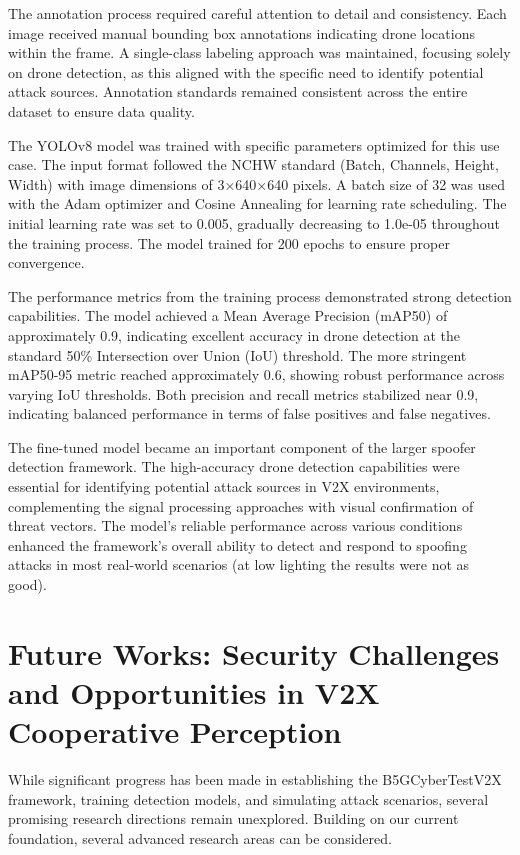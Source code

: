 The annotation process required careful attention to detail and consistency. Each image received manual bounding box annotations indicating drone locations within the frame. A single-class labeling approach was maintained, focusing solely on drone detection, as this aligned with the specific need to identify potential attack sources. Annotation standards remained consistent across the entire dataset to ensure data quality.

The YOLOv8 model was trained with specific parameters optimized for this use case. The input format followed the NCHW standard (Batch, Channels, Height, Width) with image dimensions of 3×640×640 pixels. A batch size of 32 was used with the Adam optimizer and Cosine Annealing for learning rate scheduling. The initial learning rate was set to 0.005, gradually decreasing to 1.0e-05 throughout the training process. The model trained for 200 epochs to ensure proper convergence.

The performance metrics from the training process demonstrated strong detection capabilities. The model achieved a Mean Average Precision (mAP50) of approximately 0.9, indicating excellent accuracy in drone detection at the standard 50\% Intersection over Union (IoU) threshold. The more stringent mAP50-95 metric reached approximately 0.6, showing robust performance across varying IoU thresholds. Both precision and recall metrics stabilized near 0.9, indicating balanced performance in terms of false positives and false negatives.

The fine-tuned model became an important component of the larger spoofer detection framework. The high-accuracy drone detection capabilities were essential for identifying potential attack sources in V2X environments, complementing the signal processing approaches with visual confirmation of threat vectors. The model's reliable performance across various conditions enhanced the framework's overall ability to detect and respond to spoofing attacks in most real-world scenarios (at low lighting the results were not as good).

\section{Future Works: Security Challenges and Opportunities in V2X Cooperative Perception}

While significant progress has been made in establishing the B5GCyberTestV2X framework, training detection models, and simulating attack scenarios, several promising research directions remain unexplored. Building on our current foundation, several advanced research areas can be considered.

